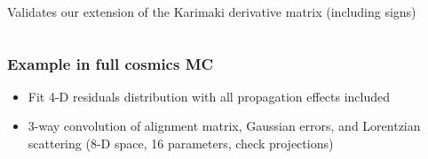 \documentclass[compress]{beamer}
\begin{document}
\begin{frame}
\begin{columns}
\vspace{0.3 cm}
Validates our extension of the Karimaki derivative matrix (including signs)

\vspace{0.3 cm}
\end{columns}
\end{frame}

\begin{frame}
\frametitle{Example in full cosmics MC}
\begin{itemize}
\item Fit 4-D residuals distribution with all propagation effects included
\item 3-way convolution of alignment matrix, Gaussian errors, and Lorentzian scattering (8-D space, 16 parameters, check projections)
\end{itemize}


\end{frame}
\end{document}
